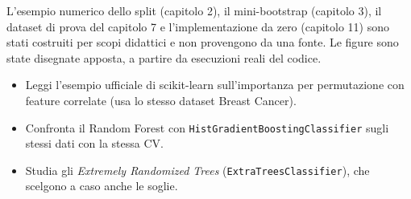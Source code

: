 \begin{attenzione}
L'esempio numerico dello split (capitolo 2), il mini-bootstrap (capitolo 3), il dataset di prova del capitolo 7 e l'implementazione da zero (capitolo 11) sono stati costruiti per scopi didattici e non provengono da una fonte. Le figure sono state disegnate apposta, a partire da esecuzioni reali del codice.
\end{attenzione}

\begin{mlbox}
\begin{itemize}
  \item Leggi l'esempio ufficiale di scikit-learn sull'importanza per permutazione con feature correlate (usa lo stesso dataset Breast Cancer).
  \item Confronta il Random Forest con \texttt{HistGradientBoostingClassifier} sugli stessi dati con la stessa CV.
  \item Studia gli \emph{Extremely Randomized Trees} (\texttt{ExtraTreesClassifier}), che scelgono a caso anche le soglie.
\end{itemize}
\end{mlbox}
